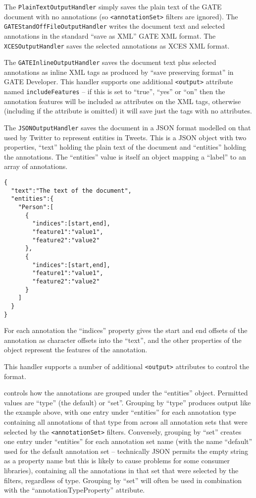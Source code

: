 The \verb!PlainTextOutputHandler! simply saves the plain text of the GATE
document with no annotations (so \verb!<annotationSet>! filters are ignored).
The \verb!GATEStandOffFileOutputHandler! writes the document text and selected
annotations in the standard ``save as XML'' GATE XML format.  The
\verb!XCESOutputHandler! saves the selected annotations as XCES XML format.

The \verb!GATEInlineOutputHandler! saves the document text plus selected
annotations as inline XML tags as produced by ``save preserving format'' in
GATE Developer.  This handler supports one additional \verb!<output>! attribute
named \verb!includeFeatures! -- if this is set to ``true'', ``yes'' or ``on''
then the annotation features will be included as attributes on the XML tags,
otherwise (including if the attribute is omitted) it will save just the tags
with no attributes.

The \verb!JSONOutputHandler! saves the document in a JSON format modelled on
that used by Twitter to represent entities in Tweets.  This is a JSON object
with two properties, ``text'' holding the plain text of the document and
``entities'' holding the annotations.  The ``entities'' value is itself an
object mapping a ``label'' to an array of annotations.
%
\begin{verbatim}
{
  "text":"The text of the document",
  "entities":{
    "Person":[
      {
        "indices":[start,end],
        "feature1":"value1",
        "feature2":"value2"
      },
      {
        "indices":[start,end],
        "feature1":"value1",
        "feature2":"value2"
      }
    ]
  }
}
\end{verbatim}

For each annotation the ``indices'' property gives the start and end offsets of
the annotation as character offsets into the ``text'', and the other properties
of the object represent the features of the annotation.

This handler supports a number of additional \verb!<output>! attributes to
control the format.

\bde
\item[groupEntitiesBy] controls how the annotations are grouped under the
  ``entities'' object.  Permitted values are ``type'' (the default) or ``set''.
  Grouping by ``type'' produces output like the example above, with one entry
  under ``entities'' for each annotation type containing all annotations of
  that type from across all annotation sets that were selected by the
  \verb!<annotationSet>! filters.  Conversely, grouping by ``set'' creates one
  entry under ``entities'' for each annotation set name (with the name
  ``default'' used for the default annotation set -- technically JSON
  permits the empty string as a property name but this is likely to cause
  problems for some consumer libraries), containing all the annotations in
  that set that were selected by the filters, regardless of type.  Grouping by
  ``set'' will often be used in combination with the ``annotationTypeProperty''
  attribute.

